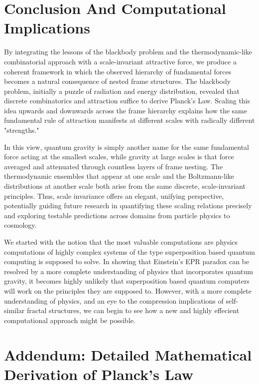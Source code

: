 \documentclass{article}
\begin{document}
\section*{Conclusion And Computational Implications}

By integrating the lessons of the blackbody problem and the thermodynamic-like combinatorial approach with a scale-invariant attractive force, we produce a coherent framework in which the observed hierarchy of fundamental forces becomes a natural consequence of nested frame structures. The blackbody problem, initially a puzzle of radiation and energy distribution, revealed that discrete combinatorics and attraction suffice to derive Planck’s Law. Scaling this idea upwards and downwards across the frame hierarchy explains how the same fundamental rule of attraction manifests at different scales with radically different "strengths."

In this view, quantum gravity is simply another name for the same fundamental force acting at the smallest scales, while gravity at large scales is that force averaged and attenuated through countless layers of frame nesting. The thermodynamic ensembles that appear at one scale and the Boltzmann-like distributions at another scale both arise from the same discrete, scale-invariant principles. Thus, scale invariance offers an elegant, unifying perspective, potentially guiding future research in quantifying these scaling relations precisely and exploring testable predictions across domains from particle physics to cosmology.

We started with the notion that the most valuable computations are physics computations of highly complex systems of the type superposition based quantum computing is supposed to solve. In showing that Einstein's EPR paradox can be resolved by a more complete understanding of physics that incorporates quantum gravity, it becomes highly unlikely that superposition based quantum computers will work on the principles they are supposed to. However, with a more complete understanding of physics, and an eye to the compression implications of self-similar fractal structures, we can begin to see how a new and highly effecient computational approach might be possible.
\newpage
\section*{Addendum: Detailed Mathematical Derivation of Planck's Law}
\end{document}
